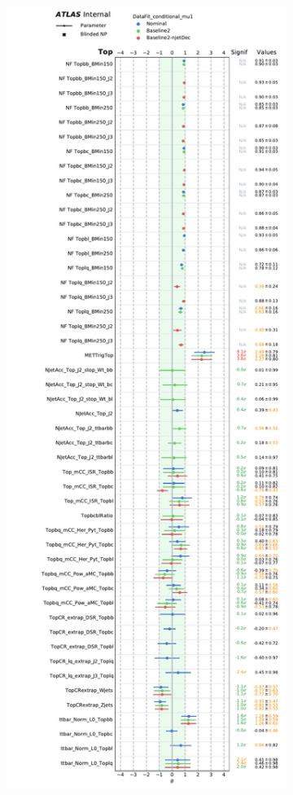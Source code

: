 \begin{figure}[h!]
\centering
\begin{subfigure}[b]{0.49\textwidth}
\includegraphics[scale=0.43]{Images/VH/clean_pull/NP_Top.pdf}

\end{subfigure}
\end{figure}
